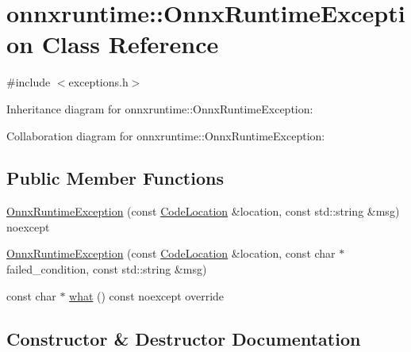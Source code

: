 \hypertarget{classonnxruntime_1_1OnnxRuntimeException}{}\section{onnxruntime\+:\+:Onnx\+Runtime\+Exception Class Reference}
\label{classonnxruntime_1_1OnnxRuntimeException}


{\ttfamily \#include $<$exceptions.\+h$>$}



Inheritance diagram for onnxruntime\+:\+:Onnx\+Runtime\+Exception\+:


Collaboration diagram for onnxruntime\+:\+:Onnx\+Runtime\+Exception\+:
\subsection*{Public Member Functions}
\begin{DoxyCompactItemize}
\item 
\mbox{\hyperlink{classonnxruntime_1_1OnnxRuntimeException_a4ba563524d67ddae1cfdf183bffd4815}{Onnx\+Runtime\+Exception}} (const \mbox{\hyperlink{structonnxruntime_1_1CodeLocation}{Code\+Location}} \&location, const std\+::string \&msg) noexcept
\item 
\mbox{\hyperlink{classonnxruntime_1_1OnnxRuntimeException_aa3c08c0c5da0d75e65c5e82845b71473}{Onnx\+Runtime\+Exception}} (const \mbox{\hyperlink{structonnxruntime_1_1CodeLocation}{Code\+Location}} \&location, const char $\ast$failed\+\_\+condition, const std\+::string \&msg)
\item 
const char $\ast$ \mbox{\hyperlink{classonnxruntime_1_1OnnxRuntimeException_af476a02759e2cf658cb7af3824f45bcc}{what}} () const noexcept override
\end{DoxyCompactItemize}


\subsection{Constructor \& Destructor Documentation}
\mbox{\label{classonnxruntime_1_1OnnxRuntimeException_a4ba563524d67ddae1cfdf183bffd4815}} 
